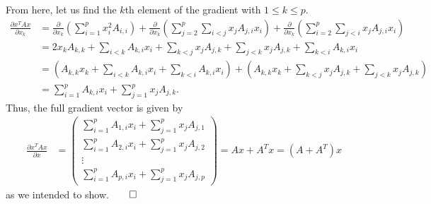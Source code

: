 \documentclass[10pt]{article}
\newcommand{\bp}[1]{\left({#1}\right)}
\newcommand{\1}[1]{\mathbbm{1}_{#1}}
\begin{document}
    From here, let us find the $k$th element of the gradient with $1\leq k\leq p$.
    \begin{align*}
        \frac{\partial x^TAx}{\partial x_k}&=\frac{\partial}{\partial x_k}\bp{\sum_{i=1}^px_i^2A_{i,i}}+\frac{\partial}{\partial x_k}\bp{\sum_{j=2}^p\sum_{i<j}x_jA_{j,i}x_i}+\frac{\partial}{\partial x_k}\bp{\sum_{i=2}^p\sum_{j<i}x_jA_{j,i}x_i}\\
        &=2x_kA_{k,k}+\sum_{i<k}A_{k,i}x_i+\sum_{k<j}x_jA_{j,k}+\sum_{j<k}x_jA_{j,k}+\sum_{k<i}A_{k,i}x_i\\
        &=\bp{A_{k,k}x_k+\sum_{i<k}A_{k,i}x_i+\sum_{k<i}A_{k,i}x_i}+\bp{A_{k,k}x_k+\sum_{k<j}x_jA_{j,k}+\sum_{j<k}x_jA_{j,k}}\\
        &=\sum_{i=1}^pA_{k,i}x_i+\sum_{j=1}^px_jA_{j,k}.
    \end{align*}
    Thus, the full gradient vector is given by
    \begin{align*}
       \frac{\partial x^TAx}{\partial x}&=\begin{pmatrix}
            \sum_{i=1}^pA_{1,i}x_i+\sum_{j=1}^px_jA_{j,1}\\
            \sum_{i=1}^pA_{2,i}x_i+\sum_{j=1}^px_jA_{j,2}\\
            \vdots \\
            \sum_{i=1}^pA_{p,i}x_i+\sum_{j=1}^px_jA_{j,p}
       \end{pmatrix} = Ax+A^Tx=(A+A^T)x
    \end{align*}
    as we intended to show.\hfill{$\qed$}\\[5pt]
\end{document}
